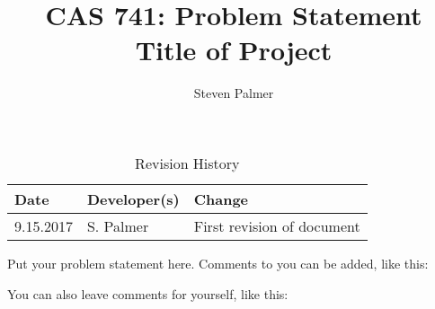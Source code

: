 \documentclass{article}
\title{CAS 741: Problem Statement\\Title of Project}
\author{Steven Palmer\qquad\<}
\date{}
\begin{document}
\maketitle

\begin{table}[hp]
\caption{Revision History} \label{TblRevisionHistory}
\begin{tabularx}{\textwidth}{llX}
\toprule
\textbf{Date} & \textbf{Developer(s)} & \textbf{Change}\\
\midrule
9.15.2017 & S. Palmer & First revision of document\\
\bottomrule
\end{tabularx}
\end{table}

Put your problem statement here.  Comments to you can be added, like this:


You can also leave comments for yourself, like this:

\end{document}
